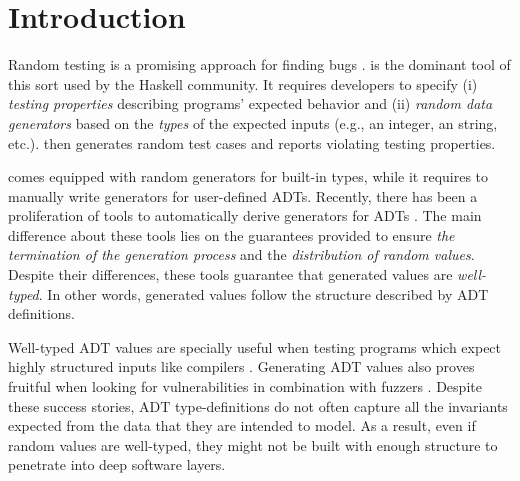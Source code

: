 \section{Introduction}

Random testing is a promising approach for finding bugs
\cite{HughesNSA16,HughesPAN16,ArtsHNS15}.
%
\quickcheck \cite{ClaessenH00} is the dominant tool of this sort used by the
Haskell community.
%
It requires developers to specify (i) \emph{testing properties} describing
programs' expected behavior and (ii) \emph{random data generators} based on the
\emph{types} of the expected inputs (e.g., an integer, an string,
etc.). %
%
\quickcheck then generates random test cases and reports violating testing
properties.


\quickcheck comes equipped with random generators for built-in types, while it
requires to manually write generators for user-defined ADTs.
%
Recently, there has been a proliferation of tools to automatically derive
\quickcheck generators for ADTs
\cite{mitchell2007,RuncimanNL08,DuregardJW12,grieco2017,DBLP:conf/haskell/MistaRH18}.
%
The main difference about these tools lies on the guarantees provided to ensure
\emph{the termination of the generation process} and the \emph{distribution of
  random values}.
%
Despite their differences, these tools guarantee that generated values are
\emph{well-typed}.
%
In other words, generated values follow the structure described by ADT
definitions.


Well-typed ADT values are specially useful when testing programs which expect
highly structured inputs like compilers
\cite{Palka11,MidtgaardJKNN17,klein2009randomized}.
%
Generating ADT values also proves fruitful when looking for vulnerabilities in
combination with fuzzers \cite{GriecoCB16,grieco2017}.
%
%
Despite these success stories, ADT type-definitions do not often capture all the
invariants expected from the data that they are intended to model.
%
As a result, even if random values are well-typed, they might not be built with
enough structure to penetrate into deep software layers.


